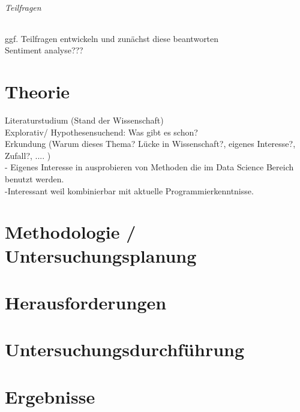 \documentclass[12pt, 
	a4paper, 
	oneside, 
	leqno]{scrreprt}
\begin{document}
\subparagraph{Teilfragen}

ggf. Teilfragen entwickeln und zunächst diese beantworten \\

Sentiment analyse???

\chapter{Theorie}

Literaturstudium (Stand der Wissenschaft) \\

Explorativ/ Hypothesensuchend: Was gibt es schon? \\

Erkundung (Warum dieses Thema? Lücke in Wissenschaft?, 
eigenes Interesse?, Zufall?, .... ) \\
- Eigenes Interesse in ausprobieren von Methoden die im Data Science Bereich benutzt werden. \\
-Interessant weil kombinierbar mit aktuelle Programmierkenntnisse.

\chapter{Methodologie / Untersuchungsplanung}





\chapter{Herausforderungen}

\chapter{Untersuchungsdurchführung}

\chapter{Ergebnisse}
\end{document}
